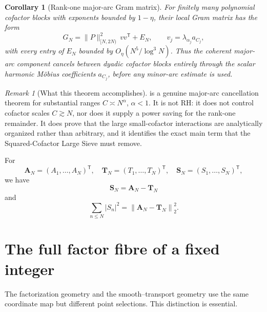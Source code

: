 \documentclass[11pt]{article}
\newtheorem{corollary}[theorem]{Corollary}
\theoremstyle{definition}
\theoremstyle{remark}
\newtheorem{remark}[theorem]{Remark}
\newcommand{\1}{\mathbf{1}}
\newcommand{\vect}[1]{\bm{#1}}
\newcommand{\norm}[1]{\left\lVert #1\right\rVert}
\begin{document}
\begin{corollary}[Rank-one major-arc Gram matrix]
\label{cor:rank-one-Gram}
For finitely many polynomial cofactor blocks with exponents bounded by
$1-\eta$, their local Gram matrix has the form
\begin{equation}
 G_N
 =\|P\|_{[N,2N)}^2\,vv^{\mathsf T}+E_N,
 \qquad
 v_j=\lambda_{\alpha_j}a_{C_j},
 \label{eq:Gram-rank-one-form}
\end{equation}
with every entry of $E_N$ bounded by
$O_\eta(N^5/\log^3N)$.  Thus the coherent major-arc component cancels
between dyadic cofactor blocks entirely through the scalar harmonic
M\"obius coefficients $a_{C_j}$, before any minor-arc estimate is used.
\end{corollary}

\begin{remark}[What this theorem accomplishes]
 is a genuine major-arc cancellation theorem
for substantial ranges $C\asymp N^\alpha$, $\alpha<1$.  It is not RH:
it does not control cofactor scales $C\gtrsim N$, nor does it supply a
power saving for the rank-one remainder.  It does prove that the large
small-cofactor interactions are analytically organized rather than
arbitrary, and it identifies the exact main term that the
Squared-Cofactor Large Sieve must remove.
\end{remark}

For
\[
 \vect A_N=(A_1,\ldots,A_N)^{\mathsf T},
 \quad
 \vect T_N=(T_1,\ldots,T_N)^{\mathsf T},
 \quad
 \vect S_N=(S_1,\ldots,S_N)^{\mathsf T},
\]
we have
\begin{equation}
 \vect S_N=\vect A_N-\vect T_N
 \label{eq:vector-AT}
\end{equation}
and
\begin{equation}
 \sum_{n\le N}|S_n|^2
 =\norm{\vect A_N-\vect T_N}_2^2.
 \label{eq:energy-AT}
\end{equation}

\section{The full factor fibre of a fixed integer}
\label{sec:full-fibre}

The factorization geometry and the smooth--transport geometry use the same coordinate map but different point selections.  This distinction is essential.
\end{document}
